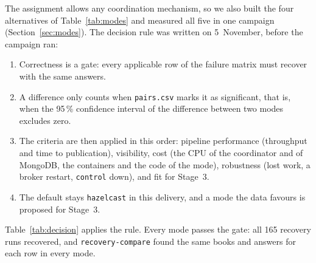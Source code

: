 \documentclass[11pt,a4paper]{article}
\newcommand{\code}[1]{\nolinkurl{#1}}
\newcommand{\mode}[1]{\code{#1}}
\begin{document}
The assignment allows any coordination mechanism, so we also built the four alternatives of Table~\ref{tab:modes} and
measured all five in one campaign (Section~\ref{sec:modes}). The decision rule was written on 5~November, before the
campaign ran:
\begin{enumerate}
\item Correctness is a gate: every applicable row of the failure matrix must recover with the same answers.
\item A difference only counts when \code{pairs.csv} marks it as significant, that is, when the 95\,\% confidence
  interval of the difference between two modes excludes zero.
\item The criteria are then applied in this order: pipeline performance (throughput and time to publication),
  visibility, cost (the CPU of the coordinator and of MongoDB, the containers and the code of the mode), robustness
  (lost work, a broker restart, \code{control} down), and fit for Stage~3.
\item The default stays \mode{hazelcast} in this delivery, and a mode the data favours is proposed for Stage~3.
\end{enumerate}

Table~\ref{tab:decision} applies the rule. Every mode passes the gate: all 165 recovery runs recovered, and
\code{recovery-compare} found the same books and answers for each row in every mode.
\end{document}
